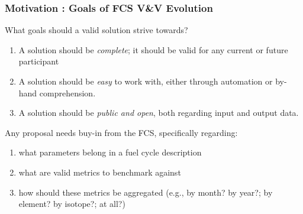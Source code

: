 \begin{frame}[ctb!]
  \frametitle{Motivation : Goals of FCS V\&V Evolution}
  What goals should a valid solution strive towards?
  \begin{enumerate}
    \item A solution should be \textit{complete}; it should be valid for any
      current or future participant
    \item A solution should be \textit{easy} to work with, either through
      automation or by-hand comprehension.
    \item A solution should be \textit{public and open}, both regarding input
      and output data.
  \end{enumerate}

  \vspace{0.4cm}

  Any proposal needs buy-in from the FCS, specifically regarding:
  \begin{enumerate}
    \item what parameters belong in a fuel cycle description
    \item what are valid metrics to benchmark against
    \item how should these metrics be aggregated (e.g., by month? by year?; by
      element? by isotope?; at all?)
  \end{enumerate}
\end{frame}
